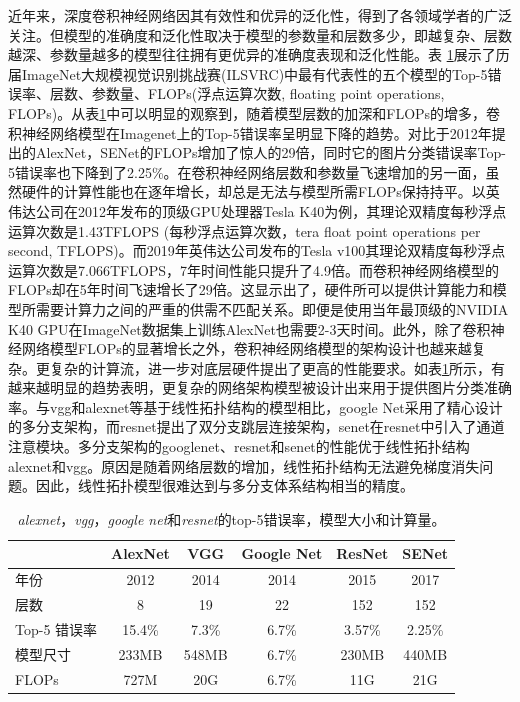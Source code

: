 近年来，深度卷积神经网络因其有效性和优异的泛化性，得到了各领域学者的广泛关注。但模型的准确度和泛化性取决于模型的参数量和层数多少，即越复杂、层数越深、参数量越多的模型往往拥有更优异的准确度表现和泛化性能。表 \ref{models}展示了历届ImageNet大规模视觉识别挑战赛(ILSVRC)中最有代表性的五个模型的Top-5错误率、层数、参数量、FLOPs(浮点运算次数, floating point operations, FLOPs)。从表\ref{models}中可以明显的观察到，随着模型层数的加深和FLOPs的增多，卷积神经网络模型在Imagenet上的Top-5错误率呈明显下降的趋势。对比于2012年提出的AlexNet，SENet的FLOPs增加了惊人的29倍，同时它的图片分类错误率Top-5错误率也下降到了2.25\%。在卷积神经网络层数和参数量飞速增加的另一面，虽然硬件的计算性能也在逐年增长，却总是无法与模型所需FLOPs保持持平。以英伟达公司在2012年发布的顶级GPU处理器Tesla K40为例，其理论双精度每秒浮点运算次数是1.43TFLOPS (每秒浮点运算次数，tera float point operations per second, TFLOPS)。而2019年英伟达公司发布的Tesla v100其理论双精度每秒浮点运算次数是7.066TFLOPS，7年时间性能只提升了4.9倍。而卷积神经网络模型的FLOPs却在5年时间飞速增长了29倍。这显示出了，硬件所可以提供计算能力和模型所需要计算力之间的严重的供需不匹配关系。即便是使用当年最顶级的NVIDIA K40 GPU在ImageNet数据集上训练AlexNet也需要2-3天时间。此外，除了卷积神经网络模型FLOPs的显著增长之外，卷积神经网络模型的架构设计也越来越复杂。更复杂的计算流，进一步对底层硬件提出了更高的性能要求。如表\ref{models}所示，有越来越明显的趋势表明，更复杂的网络架构模型被设计出来用于提供图片分类准确率。与vgg和alexnet等基于线性拓扑结构的模型相比，google Net采用了精心设计的多分支架构，而resnet提出了双分支跳层连接架构，senet在resnet中引入了通道注意模块。多分支架构的googlenet、resnet和senet的性能优于线性拓扑结构alexnet和vgg。原因是随着网络层数的增加，线性拓扑结构无法避免梯度消失问题。因此，线性拓扑模型很难达到与多分支体系结构相当的精度。
\begin{table}[h]
	\caption{\emph{alexnet}，\emph{vgg}，\emph{google net}和\emph{resnet}的top-5错误率，模型大小和计算量。}
	\centering
	\label{models}
	\begin{tabular}{lccccc}
		\hline
		& \textbf{AlexNet} & \textbf{VGG}   & \textbf{Google Net} & \textbf{ResNet}  & \textbf{SENet} \\ \hline
		年份       & 2012    & 2014  & 2014      & 2015    & 2017 \\ \hline
		层数      & 8       & 19    & 22        & 152     & 152  \\ \hline
		Top-5 错误率 & 15.4\%  & 7.3\% & 6.7\%     & 3.57\%  & 2.25\% \\ \hline
		模型尺寸 & 233MB & 548MB & 6.7\%     & 230MB & 440MB \\ \hline
		FLOPs & 727M & 20G & 6.7\%     & 11G & 21G \\ \hline
	\end{tabular}
\end{table}

